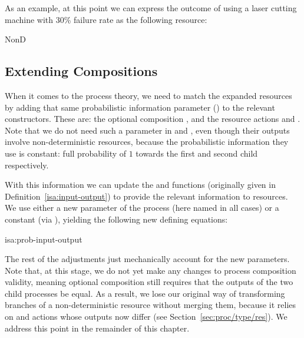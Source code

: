 \documentclass[class=smolathesis,crop=false]{standalone}
\begin{document}
As an example, at this point we can express the outcome of using a laser cutting machine with 30\% failure rate as the following resource:
\begin{isabelle}
\centering
  NonD\ \ \ 
\end{isabelle}

\subsection{Extending Compositions}
\label{sec:prob/add-prob-info/proc}

When it comes to the process theory, we need to match the expanded  resources by adding that same probabilistic information parameter () to the relevant constructors.
These are: the optional composition , and the resource actions  and .
Note that we do not need such a parameter in  and , even though their outputs involve non-deterministic resources, because the probabilistic information they use is constant: full probability of $1$ towards the first and second child respectively.

With this information we can update the  and  functions (originally given in Definition~\ref{isa:input-output}) to provide the relevant information to  resources.
We use either a new parameter of the process (here named  in all cases) or a constant (via ), yielding the following new defining equations:
\begin{isadefraw}{isa:prob-input-output}
  
\end{isadefraw}

The rest of the adjustments just mechanically account for the new parameters.
Note that, at this stage, we do not yet make any changes to process composition validity, meaning optional composition still requires that the outputs of the two child processes be equal.
As a result, we lose our original way of transforming branches of a non-deterministic resource without merging them, because it relies on  and  actions whose outputs now differ (see Section~\ref{sec:proc/type/res}).
We address this point in the remainder of this chapter.
\end{document}
